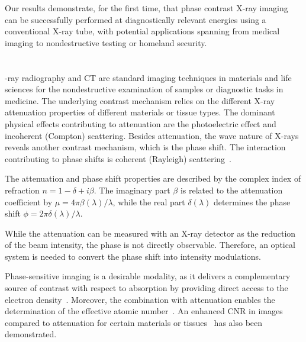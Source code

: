\documentclass{pnastwo}
\begin{document}
\begin{article}
Our results demonstrate, for the first time, that phase contrast X-ray
imaging can be successfully performed at diagnostically relevant energies
using a conventional X-ray tube, with potential applications spanning from
medical imaging to nondestructive testing or homeland security.

\section{}
-ray radiography and CT are standard imaging techniques in
materials and life sciences for the nondestructive examination of samples or
diagnostic tasks in medicine. The underlying contrast mechanism
relies on the different X-ray attenuation properties of different materials
or tissue types. The dominant physical effects contributing to attenuation
are the photoelectric effect and incoherent (Compton) scattering. Besides attenuation, the wave
nature of X-rays reveals another contrast mechanism, which is the phase
shift. The interaction contributing to phase shifts is coherent (Rayleigh)
scattering~\cite{Als-Nielsen2011}.

The attenuation and phase shift properties are described by the complex index of refraction
$n=1-\delta + i \beta$.
The imaginary part $\beta$ is related to the
attenuation coefficient by $\mu = 4 \pi
\beta(\lambda) / \lambda$, while the real part
$\delta(\lambda)$ determines the phase shift 
$\phi = 2 \pi \delta(\lambda) / \lambda$.

While the attenuation can be measured with an
X-ray detector as the reduction of the beam intensity, the phase
is not directly observable. Therefore, an optical system is needed to
convert the phase shift into intensity modulations.

Phase-sensitive
imaging is a desirable modality, as it delivers a complementary source of
contrast with respect to absorption by providing direct access 
to the electron density~\cite{Als-Nielsen2011}. Moreover, the combination with
attenuation enables the determination of the effective atomic
number~\cite{Qi2010}.
An enhanced
CNR in images compared to attenuation for certain
materials or tissues~\cite{Pfeiffer2007a,McDonald2009} has also been
demonstrated.


\end{article}
\end{document}

